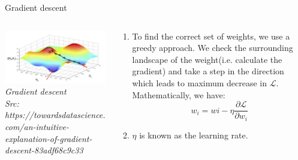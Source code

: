 \begin{frame}{Gradient descent}
  \begin{columns}[T]
  \begin{column}{0.4\textwidth}
	\includegraphics[width=\textwidth]{images/grad-desc.png}
	\tiny{\textit{Gradient descent\\ Src: https://towardsdatascience.com/an-intuitive-explanation-of-gradient-descent-83adf68c9c33}}
  \end{column}
  \begin{column}{0.6\textwidth}
  \begin{enumerate}[$\bullet$]
  \item To find the correct set of weights, we use a greedy approach. We check the surrounding landscape of the weight(i.e. calculate the gradient) and take a step in the direction which leads to maximum decrease in $\mathcal L$. Mathematically, we have:
  $$w_i=wi-\eta \frac{\partial \mathcal L}{\partial w_i}$$\pause
  \item $\eta$ is known as the learning rate.
  \end{enumerate}
  \end{column}
\end{columns}
\end{frame}


